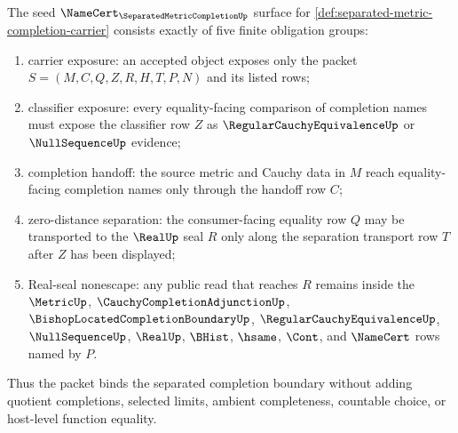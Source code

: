 \begin{theorem}
\label{thm:separated-metric-completion-namecert-obligations}
The seed $\NameCert_{\SeparatedMetricCompletionUp}$ surface for \autoref{def:separated-metric-completion-carrier} consists exactly of five finite obligation groups:
\begin{enumerate}
\item carrier exposure: an accepted object exposes only the packet $S=(M,C,Q,Z,R,H,T,P,N)$ and its listed rows;
\item classifier exposure: every equality-facing comparison of completion names must expose the classifier row $Z$ as $\RegularCauchyEquivalenceUp$ or $\NullSequenceUp$ evidence;
\item completion handoff: the source metric and Cauchy data in $M$ reach equality-facing completion names only through the handoff row $C$;
\item zero-distance separation: the consumer-facing equality row $Q$ may be transported to the $\RealUp$ seal $R$ only along the separation transport row $T$ after $Z$ has been displayed;
\item Real-seal nonescape: any public read that reaches $R$ remains inside the $\MetricUp$, $\CauchyCompletionAdjunctionUp$, $\BishopLocatedCompletionBoundaryUp$, $\RegularCauchyEquivalenceUp$, $\NullSequenceUp$, $\RealUp$, $\BHist$, $\hsame$, $\Cont$, and $\NameCert$ rows named by $P$.
\end{enumerate}
Thus the packet binds the separated completion boundary without adding quotient completions, selected limits, ambient completeness, countable choice, or host-level function equality.
\end{theorem}
